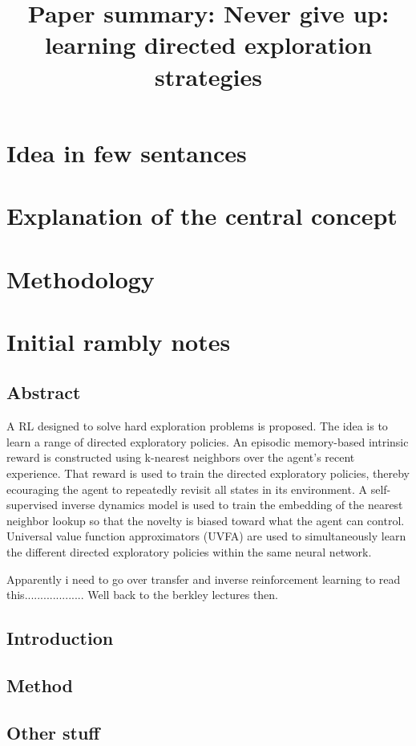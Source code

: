 \documentclass{article}
\title{Paper summary: Never give up: learning directed exploration strategies}
\begin{document}
\maketitle


\section{Idea in few sentances}



\section{Explanation of the central concept}




\section{Methodology}


\section{Initial rambly notes}


\subsection{Abstract}
A RL designed to solve hard exploration problems is proposed.
The idea is to learn a range of directed exploratory policies. 
An episodic memory-based intrinsic reward is constructed using k-nearest neighbors over the agent's recent experience.
That reward is used to train the directed exploratory policies, thereby ecouraging the agent to
repeatedly revisit all states in its environment.
A self-supervised inverse dynamics model is used to train the embedding of the nearest neighbor lookup
so that the novelty is biased toward what the agent can control.
Universal value function approximators (UVFA) are used to simultaneously learn the different directed
exploratory policies within the same neural network.

Apparently i need to go over transfer and inverse reinforcement learning to read this...................
Well
back to the berkley lectures then.

\subsection{Introduction}

\subsection{Method}

\subsection{Other stuff}
\end{document}
